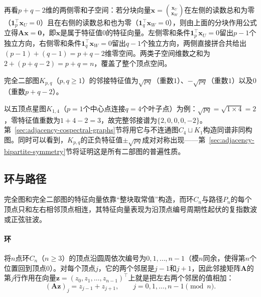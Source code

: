 再看$p+q-2$维的两侧零和子空间：若分块向量$\bm x=\binom{\bm x_U}{\bm x_W}$在左侧的读数总和为零（$\bm 1_p^\top\bm x_U=0$）且在右侧的读数总和也为零（$\bm 1_q^\top\bm x_W=0$），则由上面的分块作用公式立得$\bm A\bm x=\bm 0$，即$\bm x$是属于特征值$0$的特征向量。左侧零和条件$\bm 1_p^\top\bm x_U=0$留出$p-1$个独立方向，右侧零和条件$\bm 1_q^\top\bm x_W=0$留出$q-1$个独立方向，两侧直接拼合共给出$(p-1)+(q-1)=p+q-2$维零空间。两类子空间维数之和为$2+(p+q-2)=p+q=n$，覆盖了整个顶点空间。

\begin{theorem}[完全二部图的邻接谱]
\label{prop:adjacency-bipartite-complete-spectrum}
完全二部图$K_{p,q}$（$p,q\geq 1$）的邻接特征值为$\sqrt{pq}$（重数$1$）、$-\sqrt{pq}$（重数$1$）以及$0$（重数$p+q-2$）。
\end{theorem}

以五顶点星图$K_{1,4}$（$p=1$个中心点连接$q=4$个叶子点）为例：$\sqrt{pq}=\sqrt{1\times 4}=2$，零特征值重数为$1+4-2=3$，故完整邻接谱为$\{2,0,0,0,-2\}$。第~\ref{sec:adjacency-cospectral-graphs}节将用它与不连通图$C_4\sqcup K_1$构造同谱非同构图。同时可以看到，$K_{p,q}$的正负特征值$\pm\sqrt{pq}$成对对称出现——第~\ref{sec:adjacency-bipartite-symmetry}节将证明这是所有二部图的普遍性质。

\subsection{环与路径}
\label{sec:adjacency-cycle-path-spectra}

完全图和完全二部图的特征向量依靠“整块取常值”构造，而环$C_n$与路径$P_n$的每个顶点只和左右相邻顶点相连，其特征向量表现为沿顶点编号周期性起伏的复指数波或正弦驻波。

\paragraph{环}

将$n$点环$C_n$（$n\ge3$）的顶点沿圆周依次编号为$0,1,\ldots,n-1$（模$n$同余，使得第$n$个位置回到顶点$0$）。对每个顶点$j$，它的两个邻居是$j-1$和$j+1$，因此邻接矩阵$\bm A$的第$j$行作用在向量$\bm z=(z_0,z_1,\ldots,z_{n-1})^\top$上就是把左右两个邻居的值相加：
\[
(\bm A\bm z)_j=z_{j-1}+z_{j+1},\qquad j=0,1,\ldots,n-1\pmod n.
\]


